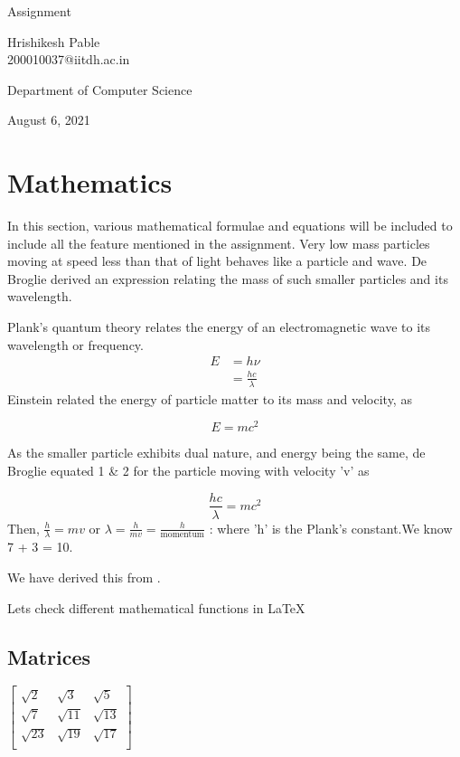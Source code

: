 \documentclass[10pt]{article}
\begin{document}
\begin{center}
\huge{ Assignment}\\
\bigskip
\medskip

\large Hrishikesh Pable\\
200010037@iitdh.ac.in

\medskip
Department of Computer Science
\bigskip
\bigskip

August 6, 2021
\end{center}

\newpage

\tableofcontents
\listoffigures
\listoftables


\newpage

\section{Mathematics}
\medskip

In this section, various mathematical formulae and equations will be included to include all the feature mentioned in the assignment. Very low mass particles moving at speed less than that of light behaves like a particle and wave. De Broglie derived an expression relating the mass of such smaller particles and its wavelength.

Plank's quantum theory relates the energy of an electromagnetic wave to its wavelength or frequency.\\


\begin{align}
 E & =h\nu \nonumber \\ 
   & =\frac{hc}{\lambda} 
\end{align}
Einstein related the energy of particle matter to its mass and velocity, as

\begin{equation}
E=mc^2
\end{equation}

As the smaller particle exhibits dual nature, and energy being the same, de Broglie equated 1 \& 2 for the particle moving with velocity 'v' as

$$\frac{hc}{\lambda}=mc^2$$
Then, $\frac{h}{\lambda}= mv$ or $\lambda = \frac{h}{mv} = \frac{h}{\text{momentum}}$ : where 'h' is the Plank's constant.We know  7 + 3 = 10.

\noindent We have derived this from \cite{verma2008concepts}.

\noindent Lets check different mathematical functions in \LaTeX

\subsection{Matrices}
$
\begin{bmatrix}
\sqrt{2} & \sqrt{3} & \sqrt{5} \\
\sqrt{7} & \sqrt{11} & \sqrt{13} \\
\sqrt{23} & \sqrt{19} & \sqrt{17} \\
\end{bmatrix}
$
\end{document}
